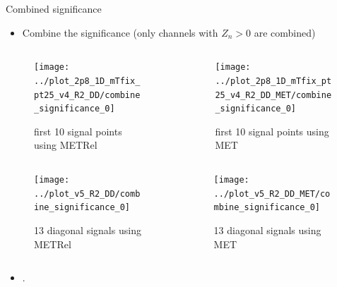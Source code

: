 \documentclass[mathserif,serif]{beamer}
\begin{document}
\begin{frame}{Combined significance}
\tiny
\begin{itemize}
\item Combine the significance (only channels with $Z_n>0$ are combined)
\end{itemize}

\begin{columns}

\begin{column}{0.4\textwidth}
\begin{figure}
\texttt{[image: ../plot\_2p8\_1D\_mTfix\_pt25\_v4\_R2\_DD/combine\_significance\_0]}
\caption{\tiny first 10 signal points using METRel}
\end{figure}
\end{column}

\begin{column}{0.4\textwidth}
\begin{figure}
\texttt{[image: ../plot\_2p8\_1D\_mTfix\_pt25\_v4\_R2\_DD\_MET/combine\_significance\_0]}
\caption{\tiny first 10 signal points using MET}
\end{figure}
\end{column}

\end{columns}

\begin{columns}

\begin{column}{0.4\textwidth}
\begin{figure}
\texttt{[image: ../plot\_v5\_R2\_DD/combine\_significance\_0]}
\caption{\tiny 13 diagonal signals using METRel}
\end{figure}
\end{column}


\begin{column}{0.4\textwidth}
\begin{figure}
\texttt{[image: ../plot\_v5\_R2\_DD\_MET/combine\_significance\_0]}
\caption{\tiny 13 diagonal signals using MET}
\end{figure}
\end{column}

\end{columns}

\begin{itemize}
\item .
\end{itemize}
\end{frame}
\end{document}
